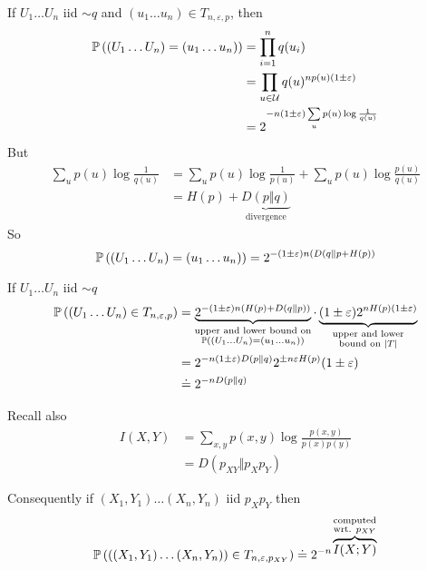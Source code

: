 \begin{theorem}
    If $U_1\ldots U_n$ iid $\sim q$ and $(u_1\ldots u_n)\in T_{n,\varepsilon,p}$, then
    \[
        \begin{aligned}
            \mathbb{P}\left( (U_1\ldots U_n) = (u_1\ldots u_n) \right) &= \prod\limits_{i=1}^n q(u_i)\\
            &= \prod\limits_{u\in\mathcal{U}} q(u)^{np(u)(1\pm \varepsilon)}\\
            &= 2^{-n(1\pm\varepsilon)\sum\limits_u p(u) \log\frac{1}{q(u)}}
        \end{aligned}
    \]
    But
    \[
        \begin{aligned}
            \sum\limits_u p(u) \log\frac{1}{q(u)} &= \sum\limits_u p(u) \log\frac{1}{p(u)} + \sum\limits_u p(u) \log\frac{p(u)}{q(u)}\\
            &= H(p) + \underbrace{D(p \Vert q)}_{\text{divergence}}
        \end{aligned}
    \]
    So
    \[
        \mathbb{P}\left( (U_1\ldots U_n) = (u_1\ldots u_n) \right) = 2^{-(1\pm\varepsilon)n(D(q\Vert p + H(p))}
    \]
\end{theorem}

\begin{corollary}
    If $U_1\ldots U_n$ iid $\sim q$
    \[
        \begin{aligned}
            \mathbb{P}\left( (U_1\ldots U_n)\in T_{n,\varepsilon,p} \right) &= \underbrace{2^{-(1\pm\varepsilon)n(H(p) + D(q\Vert p))}}_{\substack{\text{upper and lower bound on}\\\mathbb{P}\left( (U_1\ldots U_n) = (u_1\ldots u_n) \right)}} \cdot \underbrace{(1\pm \varepsilon) 2 ^{nH(p)(1\pm \varepsilon)}}_{\substack{\text{upper and lower}\\\text{bound on }\left\lvert T\right\rvert}}\\
            &= 2^{-n(1\pm \varepsilon) D(p\Vert q)}2^{\pm n\varepsilon H(p)} (1\pm\varepsilon) \\
            &\doteq 2^{-nD(p\Vert q)}
        \end{aligned}
    \]
\end{corollary}


Recall also
\[
    \begin{aligned}
        I(X,Y) &= \sum\limits_{x,y} p(x,y) \log\frac{p(x,y)}{p(x)p(y)}\\
        &= D(p_{XY} \Vert p_X p_Y)
    \end{aligned}
\]

Consequently if $(X_1,Y_1)\ldots(X_n,Y_n)$ iid $p_Xp_Y$ then
\[
    \mathbb{P}\left( ((X_1,Y_1)\ldots(X_n,Y_n)) \in T_{n,\varepsilon, p_{XY}} \right) \doteq 2^{-n\overbrace{I(X;Y)}^{\substack{\text{computed}\\\text{wrt. } p_{XY}}}}
\]

